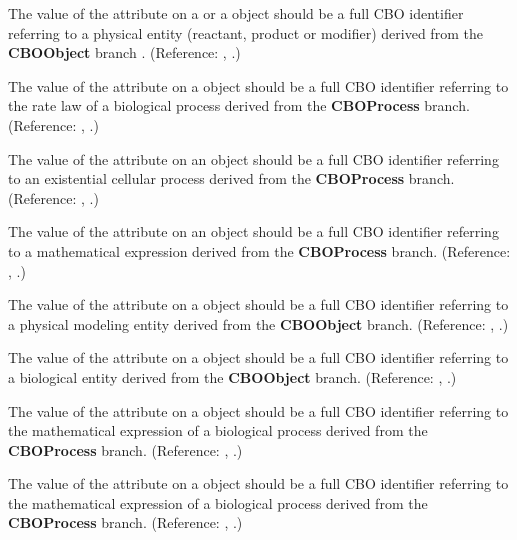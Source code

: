  {The value of the attribute  on a \SpeciesReference or a \ModifierSpeciesReference object should be a full CBO identifier referring to a physical entity (reactant, product or modifier) derived from the \textbf{CBO\textunderscore Object} branch .  (Reference: \sbmlthreedynamic, .)}

 {The value of the attribute  on a \KineticLaw object should be a full CBO identifier referring to the rate law of a biological process derived from the \textbf{CBO\textunderscore Process} branch. (Reference: \sbmlthreedynamic, .)}

 {The value of the attribute  on an \Event object should be a full CBO identifier referring to an existential cellular process derived from the \textbf{CBO\textunderscore Process} branch. (Reference: \sbmlthreedynamic, .)}

 {The value of the attribute  on an \EventAssignment object should be a full CBO identifier referring to a mathematical expression derived from the \textbf{CBO\textunderscore Process} branch. (Reference: \sbmlthreedynamic, .)}

 {The value of the attribute  on a \Compartment object should be a full CBO identifier referring to a physical modeling entity derived from the \textbf{CBO\textunderscore Object} branch. (Reference: \sbmlthreedynamic, .)}

 {The value of the attribute  on a \Species object should be a full CBO identifier referring to a biological entity derived from the \textbf{CBO\textunderscore Object} branch.  (Reference: \sbmlthreedynamic, .)}

 {The value of the attribute  on a \Trigger object should be a full CBO identifier referring to the mathematical expression of a biological process derived from the \textbf{CBO\textunderscore Process} branch. (Reference: \sbmlthreedynamic, .)}

 {The value of the attribute  on a \Delay object should be a full CBO identifier referring to the mathematical expression of a biological process derived from the \textbf{CBO\textunderscore Process} branch.  (Reference: \sbmlthreedynamic, .)}

